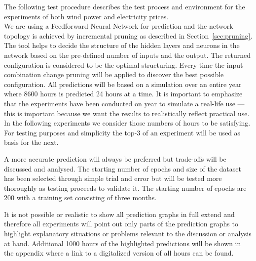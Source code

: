 The following test procedure describes the test process and environment for the experiments of both wind power and electricity prices. 
\\[0.5cm]
We are using a Feedforward Neural Network for prediction and the network topology is achieved by incremental pruning as described in Section~\ref{sec:pruning}. The tool helps to decide the structure of the hidden layers and neurons in the network based on the pre-defined number of inputs and the output. The returned configuration is considered to be the optimal structuring. Every time the input combination change pruning will be applied to discover the best possible configuration. All predictions will be based on a simulation over an entire year where 8600 hours is predicted 24 hours at a time. It is important to emphasize that the experiments have been conducted on year to simulate a real-life use --- this is important because we want the results to realistically reflect practical use. In the following experiments we consider those numbers of hours to be satisfying. For testing purposes and simplicity the top-3 of an experiment will be used as basis for the next. 

A more accurate prediction will always be preferred but trade-offs will be discussed and analysed. The starting number of epochs and size of the dataset has been selected through simple trial and error but will be tested more thoroughly as testing proceeds to validate it. The starting number of epochs are 200 with a training set consisting of three months. 

It is not possible or realistic to show all prediction graphs in full extend and therefore all experiments will point out only parts of the prediction graphs to highlight explanatory situations or problems relevant to the discussion or analysis at hand. Additional 1000 hours of the highlighted predictions will be shown in the appendix where a link to a digitalized version of all hours can be found. 

